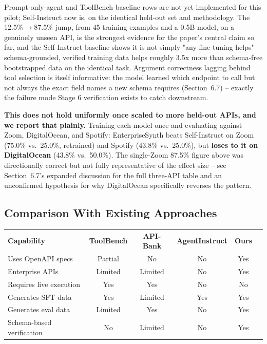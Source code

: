 \documentclass[11pt]{article}
\begin{document}
Prompt-only-agent and ToolBench baseline rows are not yet implemented for this pilot; Self-Instruct
now is, on the identical held-out set and methodology. The 12.5\%$\rightarrow$87.5\% jump, from 45
training examples and a 0.5B model, on a genuinely unseen API, is the strongest evidence for the
paper's central claim so far, and the Self-Instruct baseline shows it is not simply "any
fine-tuning helps" -- schema-grounded, verified training data helps roughly 3.5x more than
schema-free bootstrapped data on the identical task. Argument correctness lagging behind tool
selection is itself informative: the model learned which endpoint to call but not always the
exact field names a new schema requires (Section~6.7) -- exactly the failure mode Stage 6
verification exists to catch downstream.

\textbf{This does not hold uniformly once scaled to more held-out APIs, and we report that
plainly.} Training each model once and evaluating against Zoom, DigitalOcean, and Spotify:
EnterpriseSynth beats Self-Instruct on Zoom (75.0\% vs.\ 25.0\%, retrained) and Spotify (43.8\%
vs.\ 25.0\%), but \textbf{loses to it on DigitalOcean} (43.8\% vs.\ 50.0\%). The single-Zoom 87.5\%
figure above was directionally correct but not fully representative of the effect size -- see
Section~6.7's expanded discussion for the full three-API table and an unconfirmed hypothesis for
why DigitalOcean specifically reverses the pattern.

\subsection{Comparison With Existing Approaches}

\begin{center}
\small
\begin{tabular}{lccccc}
\textbf{Capability} & \textbf{ToolBench} & \textbf{API-Bank} & \textbf{AgentInstruct} & \textbf{Ours} \\
Uses OpenAPI specs & Partial & No & No & Yes \\
Enterprise APIs & Limited & Limited & No & Yes \\
Requires live execution & Yes & Yes & No & No \\
Generates SFT data & Yes & Limited & Yes & Yes \\
Generates eval data & Limited & Yes & No & Yes \\
Schema-based verification & No & Limited & No & Yes \\
\end{tabular}
\end{center}
\end{document}
